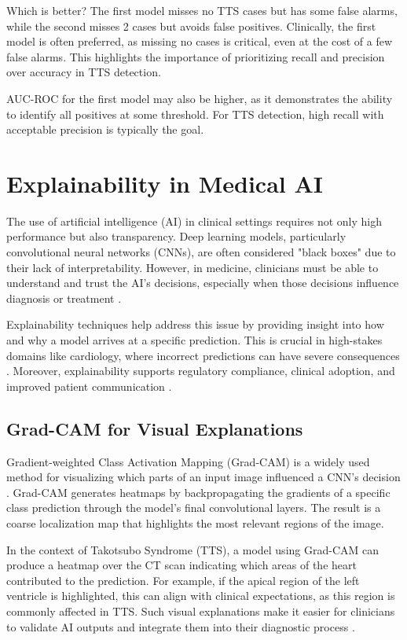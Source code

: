\documentclass[12pt, BSc]{muthesis}
\begin{document}
Which is better? The first model misses no TTS cases but has some false alarms, while the second misses 2 cases but avoids false positives. Clinically, the first model is often preferred, as missing no cases is critical, even at the cost of a few false alarms. This highlights the importance of prioritizing recall and precision over accuracy in TTS detection.

AUC-ROC for the first model may also be higher, as it demonstrates the ability to identify all positives at some threshold. For TTS detection, high recall with acceptable precision is typically the goal.

\section{Explainability in Medical AI}
\label{sec:explainability}
The use of artificial intelligence (AI) in clinical settings requires not only high performance but also transparency. Deep learning models, particularly convolutional neural networks (CNNs), are often considered "black boxes" due to their lack of interpretability. However, in medicine, clinicians must be able to understand and trust the AI’s decisions, especially when those decisions influence diagnosis or treatment \cite{holzinger2017we, gilpin2018explaining}.

Explainability techniques help address this issue by providing insight into how and why a model arrives at a specific prediction. This is crucial in high-stakes domains like cardiology, where incorrect predictions can have severe consequences \cite{tjoa2020survey}. Moreover, explainability supports regulatory compliance, clinical adoption, and improved patient communication \cite{samek2017explainable}.

\subsection{Grad-CAM for Visual Explanations}
Gradient-weighted Class Activation Mapping (Grad-CAM) is a widely used method for visualizing which parts of an input image influenced a CNN’s decision \cite{selvaraju2017grad}. Grad-CAM generates heatmaps by backpropagating the gradients of a specific class prediction through the model’s final convolutional layers. The result is a coarse localization map that highlights the most relevant regions of the image.

In the context of Takotsubo Syndrome (TTS), a model using Grad-CAM can produce a heatmap over the CT scan indicating which areas of the heart contributed to the prediction. For example, if the apical region of the left ventricle is highlighted, this can align with clinical expectations, as this region is commonly affected in TTS. Such visual explanations make it easier for clinicians to validate AI outputs and integrate them into their diagnostic process \cite{holzinger2017we}.
\end{document}
